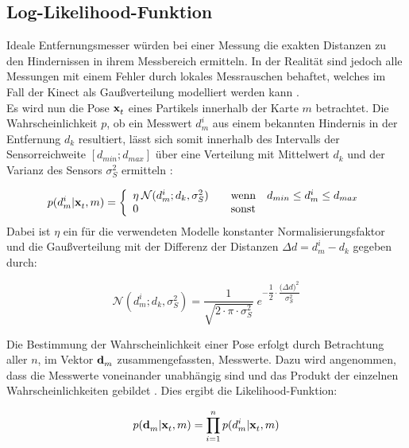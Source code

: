 
\subsection{Log-Likelihood-Funktion}
\label{chap.loglik}
Ideale Entfernungsmesser würden bei einer Messung die exakten Distanzen zu den Hindernissen in ihrem Messbereich ermitteln. In der Realität sind jedoch alle Messungen mit einem Fehler durch lokales Messrauschen behaftet, welches im Fall der Kinect als Gaußverteilung modelliert werden kann \cite{Nguyen2012}.\\

Es wird nun die Pose $\mathbf{x}^{}_{t}$ eines Partikels innerhalb der Karte $m$ betrachtet. Die Wahrscheinlichkeit $p$, ob ein Messwert $d_m^i$ aus einem bekannten Hindernis in der Entfernung $d_k$ resultiert, lässt sich somit innerhalb des Intervalls der Sensorreichweite $[d_{min};d_{max}]$ über eine Verteilung mit Mittelwert $d_k$ und der Varianz des Sensors $\sigma_{S}^2$ ermitteln \cite{Thrun2005}:

\begin{equation}
p(d_m^i|\mathbf{x}^{}_{t},m) = \left\lbrace\begin{array}{ll}
\eta \: \mathcal{N}(d_m^i;d_k,\sigma_S^2) & \quad \mathrm{wenn} \quad d_{min}\leq d_m^i \leq d_{max} \\
0 & \quad \mathrm{sonst}
\end{array}
\right.
\end{equation}
Dabei ist $\eta$ ein für die verwendeten Modelle konstanter Normalisierungsfaktor und die Gaußverteilung mit der Differenz der Distanzen $\Delta d = d_m^i-d_k$  gegeben durch:

\begin{equation}
\mathcal{N}(d_m^i;d_k,\sigma_S^2) = \frac{1}{\sqrt{2 \cdot \pi \cdot \sigma_S^2}} \; e^{-\dfrac{1}{2} \cdot \dfrac{{(\Delta d})^2}{\sigma_S^2}}
\end{equation}

Die Bestimmung der Wahrscheinlichkeit einer Pose erfolgt durch Betrachtung aller $n$, im Vektor $\mathbf{d}^{}_{m}$ zusammengefassten, Messwerte. Dazu wird angenommen, dass die Messwerte voneinander unabhängig sind und das Produkt der einzelnen Wahrscheinlichkeiten gebildet \cite{Hornung2010}. Dies ergibt die Likelihood-Funktion:

\begin{equation}
\label{eq.likelihood}
p(\mathbf{d}^{}_{m}|\mathbf{x}^{}_{t},m) = \prod_{i=1}^{n}p(d_m^i|\mathbf{x}^{}_{t},m)
\end{equation}

